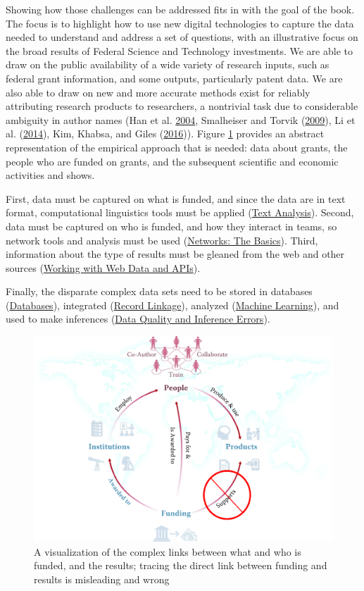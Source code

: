 \documentclass[]{krantz}
\begin{document}
Showing how those challenges can be addressed fits in with the goal of
the book. The focus is to highlight how to use new digital technologies
to capture the data needed to understand and address a set of questions,
with an illustrative focus on the broad results of Federal Science and
Technology investments. We are able to draw on the public availability
of a wide variety of research inputs, such as federal grant information,
and some outputs, particularly patent data. We are also able to draw on
new and more accurate methods exist for reliably attributing research
products to researchers, a nontrivial task due to considerable ambiguity
in author names (Han et al. \protect\hyperlink{ref-han2004two}{2004},
Smalheiser and Torvik
(\protect\hyperlink{ref-smalheiser2009author}{2009}), Li et al.
(\protect\hyperlink{ref-li2014disambiguation}{2014}), Kim, Khabsa, and
Giles (\protect\hyperlink{ref-kim2016inventor}{2016})). Figure
\ref{fig:fig2} provides an abstract representation of the empirical
approach that is needed: data about grants, the people who are funded on
grants, and the subsequent scientific and economic activities and shows.

First, data must be captured on what is funded, and since the data are
in text format, computational linguistics tools must be applied
(\protect\hyperlink{chap:text}{Text Analysis}). Second, data must be
captured on who is funded, and how they interact in teams, so network
tools and analysis must be used
(\protect\hyperlink{chap:networks}{Networks: The Basics}). Third,
information about the type of results must be gleaned from the web and
other sources (\protect\hyperlink{chap:web}{Working with Web Data and
APIs}).

Finally, the disparate complex data sets need to be stored in databases
(\protect\hyperlink{chap:db}{Databases}), integrated
(\protect\hyperlink{chap:link}{Record Linkage}), analyzed
(\protect\hyperlink{chap:ml}{Machine Learning}), and used to make
inferences (\protect\hyperlink{chap:errors}{Data Quality and Inference
Errors}).

\begin{figure}

{\centering \includegraphics[width=0.7\linewidth]{ChapterIntro/figures/figure_cameron} 

}

\caption{A visualization of the complex links between what and who is funded, and the results; tracing the direct link between funding and results is misleading and wrong}\label{fig:fig2}
\end{figure}
\end{document}
